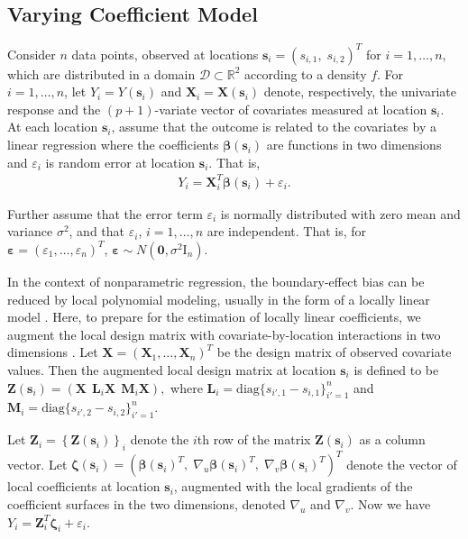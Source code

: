 \documentclass[authoryear,review, 12pt]{elsarticle}
\begin{document}
\subsection{Varying Coefficient Model}

Consider $n$ data points, observed at locations $\bm{s}_{i}=(s_{i,1},\; s_{i,2})^{T}$
for $i=1,\dots,n$, which are distributed in a domain $\mathcal{D}\subset\mathbb{R}^{2}$
according to a density $f$. For $i=1,\dots,n$, let $Y_{i}=Y(\bm{s}_{i})$
and $\bm{X}_{i}=\bm{X}(\bm{s}_{i})$ denote, respectively, the univariate
response and the $(p+1)$-variate vector of covariates measured at
location $\bm{s}_{i}$. At each location $\bm{s}_{i}$, assume that
the outcome is related to the covariates by a linear regression where
the coefficients $\bm{\beta}(\bm{s}_{i})$ are functions in two dimensions
and $\varepsilon_{i}$ is random error at location $\bm{s}_{i}$.
That is, 
\begin{align}
Y_{i}=\bm{X}_{i}^{T}\bm{\beta}(\bm{s}_{i})+\varepsilon_{i}.\label{eq:lm(s)}
\end{align}


Further assume that the error term $\varepsilon_{i}$ is normally
distributed with zero mean and variance $\sigma^{2}$, and that $\varepsilon_{i}$,
$i=1,\dots,n$ are independent. That is, for $\bm{\varepsilon}=\left(\varepsilon_{1},\dots,\varepsilon_{n}\right)^{T}$,
$\bm{\varepsilon}\sim N\left(\bm{0},\sigma^{2}\bm{\mathrm{I}}_{n}\right)$. 

In the context of nonparametric regression, the boundary-effect bias
can be reduced by local polynomial modeling, usually in the form of
a locally linear model \citep{Fan-Gijbels-1996}. Here, to prepare
for the estimation of locally linear coefficients, we augment the
local design matrix with covariate-by-location interactions in two
dimensions \citep{Wang-2008b}. Let $\bm{X}=\left(\bm{X}_{1},\dots,\bm{X}_{n}\right)^{T}$
be the design matrix of observed covariate values. Then the augmented
local design matrix at location $\bm{s}_{i}$ is defined to be $\bm{Z}(\bm{s}_{i})=\left(\bm{X}\ \:\bm{L}_{i}\bm{X}\ \:\bm{M}_{i}\bm{X}\right),$
where $\bm{L}_{i}=\text{diag}\{s_{i',1}-s_{i,1}\}_{i'=1}^{n}$ and
$\bm{M}_{i}=\text{diag}\{s_{i',2}-s_{i,2}\}_{i'=1}^{n}$.

Let $\bm{Z}_{i}=\left\{ \bm{Z}(\bm{s}_{i})\right\} _{i}$ denote the
$i$th row of the matrix $\bm{Z}(\bm{s}_{i})$ as a column vector.
Let $\bm{\zeta}(\bm{s}_{i})=\left(\bm{\beta}(\bm{s}_{i})^{T},\;\nabla_{u}\bm{\beta}(\bm{s}_{i})^{T},\;\nabla_{v}\bm{\beta}(\bm{s}_{i})^{T}\right)^{T}$
denote the vector of local coefficients at location $\bm{s}_{i}$,
augmented with the local gradients of the coefficient surfaces in
the two dimensions, denoted $\nabla_{u}$ and $\nabla_{v}$. Now we
have $Y_{i}=\bm{Z}_{i}^{T}\bm{\zeta}_{i}+\varepsilon_{i}$.
\end{document}
